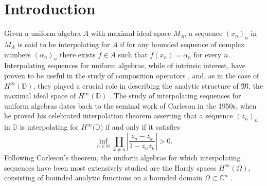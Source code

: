\documentclass[preprint,12pt,number]{elsarticle}
\newcommand{\N}{\mathbb{N}}
\begin{document}


\section{Introduction}
\vspace{0.3cm}
Given a uniform algebra $A$ with maximal ideal space $M_A$, a sequence $(x_n)_n$ in $M_A$ is said to be interpolating for $A$ if for any bounded sequence of complex numbers $(\alpha_n)_n$ there exists $f \in A$ such that $f(x_n)=\alpha_n$ for every $n$. Interpolating sequences for uniform algebras, while of intrinsic interest, have proven to be useful in the study of composition operators \cite{GalindoGamelinLindstrom2004,Hosokawa2002}, and, as in the case of $H^\infty(\mathbb{D})$, they played a crucial role in describing the analytic structure of $\mathfrak{M}$, the maximal ideal space of $H^\infty(\mathbb{D})$ \cite{Hoffman1967}. The study of interpolating sequences for uniform algebras dates back to the seminal work of Carleson \cite{Carleson1958} in the 1950s, when he proved his celebrated interpolation theorem asserting that a sequence $(z_n)_n$ in $\mathbb{D}$ is interpolating for $H^\infty(\mathbb{D)}$ if and only if it satisfies \begin{equation}\label{Carleson's condition}
        \inf_{n\in\N}\prod_{k\neq n}\left| \frac{z_n-z_k}{1-\overline{z_n}z_k}\right|>0.
    \end{equation} Following Carleson's theorem, the uniform algebras for which interpolating sequences have been most extensively studied are the Hardy spaces $H^\infty(\Omega)$, consisting of bounded analytic functions on a bounded domain $\Omega \subset \mathbb{C}^n$ \cite{AglerMcCarthy2001,Amar1980,Berndtsson1985,BerndtssonChangLin1987,Kronstadt1974,KronstadtNeville1977}.
\end{document}
